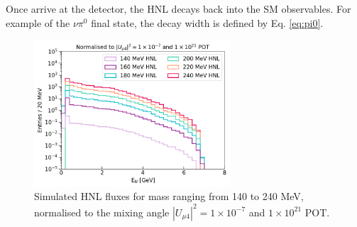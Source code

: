 Once arrive at the detector, the HNL decays back into the SM observables.
For example of the $\nu\pi^{0}$ final state, the decay width is defined by Eq. \ref{eq:pi0}.
\begin{figure}[tbp!] 
\centering    
\includegraphics[width=0.65\textwidth]{HNL_Energy_Spectrum}
\caption[HNL_Energy_Spectrum]{
Simulated HNL fluxes for mass ranging from 140 to 240 MeV, normalised to the mixing angle $|U_{\mu4}|^{2} = 1 \times 10^{-7}$ and $1 \times 10^{21}$ POT.
}
\label{fig:HNL_Energy_Spectrum}



\end{figure}
